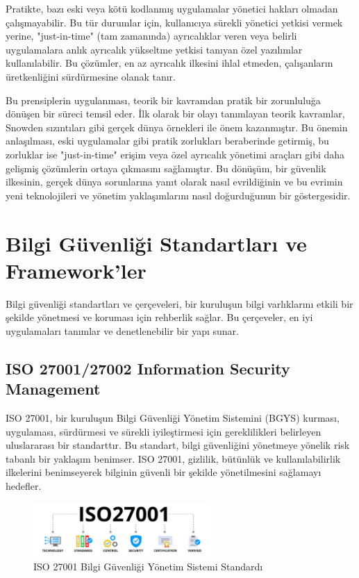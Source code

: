Pratikte, bazı eski veya kötü kodlanmış uygulamalar yönetici hakları olmadan çalışmayabilir. Bu tür durumlar için, kullanıcıya sürekli yönetici yetkisi vermek yerine, "just-in-time" (tam zamanında) ayrıcalıklar veren veya belirli uygulamalara anlık ayrıcalık yükseltme yetkisi tanıyan özel yazılımlar kullanılabilir. Bu çözümler, en az ayrıcalık ilkesini ihlal etmeden, çalışanların üretkenliğini sürdürmesine olanak tanır.

Bu prensiplerin uygulanması, teorik bir kavramdan pratik bir zorunluluğa dönüşen bir süreci temsil eder. İlk olarak bir olayı tanımlayan teorik kavramlar, Snowden sızıntıları gibi gerçek dünya örnekleri ile önem kazanmıştır. Bu önemin anlaşılması, eski uygulamalar gibi pratik zorlukları beraberinde getirmiş, bu zorluklar ise "just-in-time" erişim veya özel ayrıcalık yönetimi araçları gibi daha gelişmiş çözümlerin ortaya çıkmasını sağlamıştır. Bu dönüşüm, bir güvenlik ilkesinin, gerçek dünya sorunlarına yanıt olarak nasıl evrildiğinin ve bu evrimin yeni teknolojileri ve yönetim yaklaşımlarını nasıl doğurduğunun bir göstergesidir.

\section{Bilgi Güvenliği Standartları ve Framework'ler}

Bilgi güvenliği standartları ve çerçeveleri, bir kuruluşun bilgi varlıklarını etkili bir şekilde yönetmesi ve koruması için rehberlik sağlar. Bu çerçeveler, en iyi uygulamaları tanımlar ve denetlenebilir bir yapı sunar.

\subsection{ISO 27001/27002 Information Security Management}

ISO 27001, bir kuruluşun Bilgi Güvenliği Yönetim Sistemini (BGYS) kurması, uygulaması, sürdürmesi ve sürekli iyileştirmesi için gereklilikleri belirleyen uluslararası bir standarttır. Bu standart, bilgi güvenliğini yönetmeye yönelik risk tabanlı bir yaklaşım benimser. ISO 27001, gizlilik, bütünlük ve kullanılabilirlik ilkelerini benimseyerek bilginin güvenli bir şekilde yönetilmesini sağlamayı hedefler.

\begin{figure}[ht]
\centering
\includegraphics[width=0.6\textwidth]{img/ISO27001.png}
\caption{ISO 27001 Bilgi Güvenliği Yönetim Sistemi Standardı}
\label{fig:iso27001}
\end{figure}

